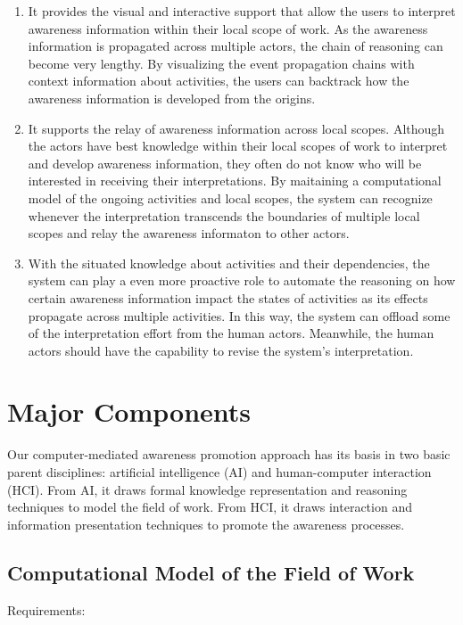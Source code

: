 \begin{enumerate}
   \item It provides the visual and interactive support that allow the users to interpret awareness information within their local scope of work. As the awareness information is propagated across multiple actors, the chain of reasoning can become very lengthy. By visualizing the event propagation chains with context information about activities, the users can backtrack how the awareness information is developed from the origins.
   
   \item It supports the relay of awareness information across local scopes. Although the actors have best knowledge within their local scopes of work to interpret and develop awareness information,  they often do not know who will be interested in receiving their interpretations. By maitaining a computational model of the ongoing activities and local scopes, the system can recognize whenever the interpretation transcends the boundaries of multiple local scopes and relay the awareness informaton to other actors.
   
   \item With the situated knowledge about activities and their dependencies, the system can play a even more proactive role to automate the reasoning on how certain awareness information impact the states of activities as its effects propagate across multiple activities. In this way, the system can offload some of the interpretation effort from the human actors. Meanwhile, the human actors should have the capability to revise the system’s interpretation.
   
\end{enumerate}

\section{Major Components} %
\label{sec:major_components}
Our computer-mediated awareness promotion approach has its basis in two basic parent disciplines:  artificial intelligence (AI) and human-computer interaction (HCI). From AI, it draws formal knowledge representation and reasoning techniques to model the field of work. From HCI, it draws interaction and information presentation techniques to promote the awareness processes.

\subsection{Computational Model of the Field of Work} %
\label{sub:computational_model_of_the_field_of_work}
Requirements:

